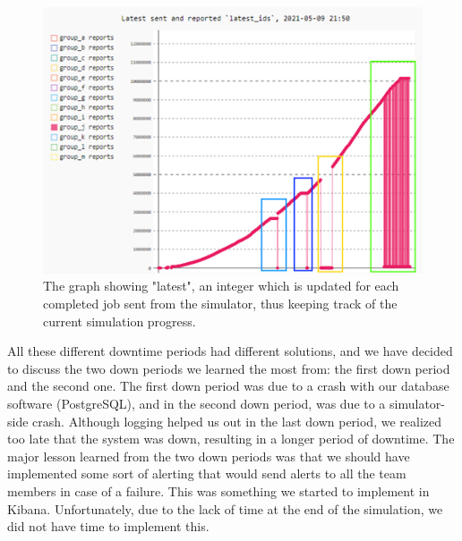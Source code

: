 \begin{figure}[h!]
    \centering
    \includegraphics[scale=0.7]{images/downperiodes.png}
    \caption{The graph showing "latest", an integer which is updated for each completed job sent from the simulator, 
    thus keeping track of the current simulation progress. }
\end{figure}
 
All these different downtime periods had different solutions, and we have decided to discuss the two down periods we 
learned the most from: the first down period and the second one. 
The first down period was due to a crash with our database software (PostgreSQL), and in the second down period, 
was due to a simulator-side crash. Although logging helped us out in the last down period, 
we realized too late that the system was down, resulting in a longer period of downtime. 
The major lesson learned from the two down periods was that we should have implemented some sort of alerting 
that would send alerts to all the team members in case of a failure. This was something we started to 
implement in Kibana. Unfortunately, due to the lack of time at the end of the simulation, we did not have time to implement this.

